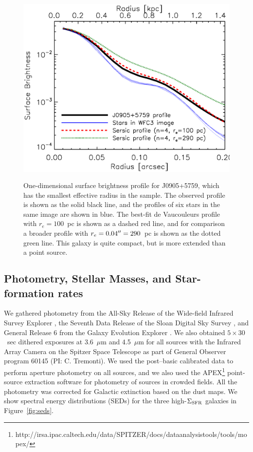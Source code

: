 \documentclass[apj]{emulateapj}
\newcommand{\sigmasfr}{\Sigma_{\textnormal{\scriptsize{SFR}}}}
\begin{document}
\begin{figure}[!t]
\includegraphics[angle=0,scale=0.41]{profile.ps}
\label{fig:profile}
\caption{One-dimensional surface brightness profile for J0905+5759,
  which has the smallest effective radius in the sample.  The observed
  profile is shown as the solid black line, and the profiles of six
  stars in the same image are shown in blue.  The best-fit de
  Vaucouleurs profile with $r_e=100$~pc is shown as a dashed red line,
  and for comparison a broader profile with $r_e=0.04\mbox{$^{\prime\prime}$}=290$~pc
  is shown as the dotted green line.  This galaxy is quite compact,
  but is more extended than a point source.}
\end{figure}



\subsection{Photometry, Stellar Masses, and Star-formation rates}

We gathered photometry from the All-Sky Release of the Wide-field
Infrared Survey Explorer \citep[WISE,][]{wri10}, the Seventh Data
Release of the Sloan Digital Sky Survey \citep[SDSS,][]{aba09}, and
General Release 6 from the Galaxy Evolution Explorer
\citep[GALEX,][]{mar05galex}.  We also obtained $5\times30$~sec
dithered exposures at 3.6~$\mu$m and 4.5~$\mu$m for all sources with
the Infrared Array Camera \citep{faz04} on the Spitzer Space Telescope
\citep{wer04} as part of General Observer program 60145 (PI:
C. Tremonti).  We used the post--basic calibrated data to perform
aperture photometry on all sources, and we also used the
APEX\footnote{http://irsa.ipac.caltech.edu/data/SPITZER/docs/dataanalysistools/tools/mopex/}
point-source extraction software for photometry of sources in crowded
fields.  All the photometry was corrected for Galactic extinction
based on the \citet{sch98} dust maps.  We show spectral energy
distributions (SEDs) for the three high-$\sigmasfr$ galaxies in
Figure~\ref{fig:seds}.
\end{document}
